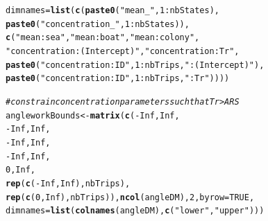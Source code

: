\documentclass[12pt]{article}\usepackage[]{graphicx}\usepackage[]{xcolor}
\makeatletter
\newcommand{\hlnum}[1]{\textcolor[rgb]{0.686,0.059,0.569}{#1}}%
\newcommand{\hlsng}[1]{\textcolor[rgb]{0.192,0.494,0.8}{#1}}%
\newcommand{\hlcom}[1]{\textcolor[rgb]{0.678,0.584,0.686}{\textit{#1}}}%
\newcommand{\hlopt}[1]{\textcolor[rgb]{0,0,0}{#1}}%
\newcommand{\hldef}[1]{\textcolor[rgb]{0.345,0.345,0.345}{#1}}%
\newcommand{\hlkwb}[1]{\textcolor[rgb]{0.69,0.353,0.396}{#1}}%
\newcommand{\hlkwc}[1]{\textcolor[rgb]{0.333,0.667,0.333}{#1}}%
\newcommand{\hlkwd}[1]{\textcolor[rgb]{0.737,0.353,0.396}{\textbf{#1}}}%
\newenvironment{kframe}{%
 \def\at@end@of@kframe{}%
 \ifinner\ifhmode%
  \def\at@end@of@kframe{\end{minipage}}%
  \begin{minipage}{\columnwidth}%
 \fi\fi%
 \def\FrameCommand##1{\hskip\@totalleftmargin \hskip-\fboxsep
 \colorbox{shadecolor}{##1}\hskip-\fboxsep
     \hskip-\linewidth \hskip-\@totalleftmargin \hskip\columnwidth}%
 \MakeFramed {\advance\hsize-\width
   \@totalleftmargin\z@ \linewidth\hsize
   \@setminipage}}%
 {\par\unskip\endMakeFramed%
 \at@end@of@kframe}
\newenvironment{knitrout}{}{} %
\makeatother
\begin{document}
\begin{knitrout}
\begin{kframe}
\begin{alltt}
                  \hlkwc{dimnames}\hldef{=}\hlkwd{list}\hldef{(}\hlkwd{c}\hldef{(}\hlkwd{paste0}\hldef{(}\hlsng{"mean_"}\hldef{,}\hlnum{1}\hlopt{:}\hldef{nbStates),}
                                  \hlkwd{paste0}\hldef{(}\hlsng{"concentration_"}\hldef{,}\hlnum{1}\hlopt{:}\hldef{nbStates)),}
                                \hlkwd{c}\hldef{(}\hlsng{"mean:sea"}\hldef{,}\hlsng{"mean:boat"}\hldef{,}\hlsng{"mean:colony"}\hldef{,}
                                  \hlsng{"concentration:(Intercept)"}\hldef{,}\hlsng{"concentration:Tr"}\hldef{,}
                                  \hlkwd{paste0}\hldef{(}\hlsng{"concentration:ID"}\hldef{,}\hlnum{1}\hlopt{:}\hldef{nbTrips,}\hlsng{":(Intercept)"}\hldef{),}
                                  \hlkwd{paste0}\hldef{(}\hlsng{"concentration:ID"}\hldef{,}\hlnum{1}\hlopt{:}\hldef{nbTrips,}\hlsng{":Tr"}\hldef{))))}

\hlcom{# constrain concentration parameters such that Tr > ARS }
\hldef{angleworkBounds} \hlkwb{<-} \hlkwd{matrix}\hldef{(}\hlkwd{c}\hldef{(}\hlopt{-}\hlnum{Inf}\hldef{,}\hlnum{Inf}\hldef{,}
                            \hlopt{-}\hlnum{Inf}\hldef{,}\hlnum{Inf}\hldef{,}
                            \hlopt{-}\hlnum{Inf}\hldef{,}\hlnum{Inf}\hldef{,}
                            \hlopt{-}\hlnum{Inf}\hldef{,}\hlnum{Inf}\hldef{,}
                            \hlnum{0}\hldef{,}\hlnum{Inf}\hldef{,}
                            \hlkwd{rep}\hldef{(}\hlkwd{c}\hldef{(}\hlopt{-}\hlnum{Inf}\hldef{,}\hlnum{Inf}\hldef{),nbTrips),}
                            \hlkwd{rep}\hldef{(}\hlkwd{c}\hldef{(}\hlnum{0}\hldef{,}\hlnum{Inf}\hldef{),nbTrips)),}\hlkwd{ncol}\hldef{(angleDM),}\hlnum{2}\hldef{,}\hlkwc{byrow}\hldef{=}\hlnum{TRUE}\hldef{,}
                         \hlkwc{dimnames}\hldef{=}\hlkwd{list}\hldef{(}\hlkwd{colnames}\hldef{(angleDM),}\hlkwd{c}\hldef{(}\hlsng{"lower"}\hldef{,}\hlsng{"upper"}\hldef{)))}


\end{alltt}
\end{kframe}
\end{knitrout}
\end{document}
